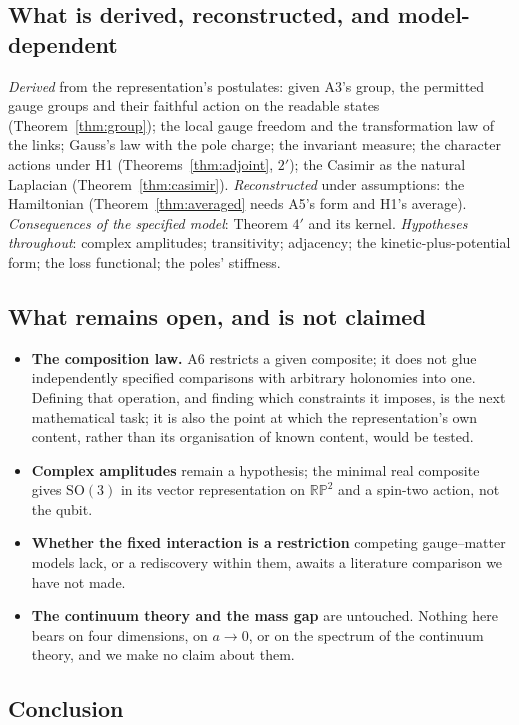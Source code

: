 \documentclass[11pt,a4paper]{article}
\theoremstyle{plain}
\theoremstyle{definition}
\theoremstyle{remark}
\newcommand{\RP}{\mathbb{RP}}
\newcommand{\SO}{\mathrm{SO}}
\begin{document}
\subsection{What is derived, reconstructed, and model-dependent}

\emph{Derived} from the representation's postulates: given A3's group, the permitted gauge groups and their faithful action on the readable states (Theorem~\ref{thm:group}); the local gauge freedom and the transformation law of the links; Gauss's law with the pole charge; the invariant measure; the character actions under H1 (Theorems~\ref{thm:adjoint}, $2'$); the Casimir as the natural Laplacian (Theorem~\ref{thm:casimir}). \emph{Reconstructed} under assumptions: the Hamiltonian (Theorem~\ref{thm:averaged} needs A5's form and H1's average). \emph{Consequences of the specified model}: Theorem $4'$ and its kernel. \emph{Hypotheses throughout}: complex amplitudes; transitivity; adjacency; the kinetic-plus-potential form; the loss functional; the poles' stiffness.

\subsection{What remains open, and is not claimed}

\begin{itemize}[leftmargin=1.5em]
\item \textbf{The composition law.} A6 restricts a given composite; it does not glue independently specified comparisons with arbitrary holonomies into one. Defining that operation, and finding which constraints it imposes, is the next mathematical task; it is also the point at which the representation's own content, rather than its organisation of known content, would be tested.
\item \textbf{Complex amplitudes} remain a hypothesis; the minimal real composite gives $\SO(3)$ in its vector representation on $\RP^2$ and a spin-two action, not the qubit.
\item \textbf{Whether the fixed interaction is a restriction} competing gauge--matter models lack, or a rediscovery within them, awaits a literature comparison we have not made.
\item \textbf{The continuum theory and the mass gap} are untouched. Nothing here bears on four dimensions, on $a\to0$, or on the spectrum of the continuum theory, and we make no claim about them.
\end{itemize}

\subsection{Conclusion}
\end{document}
